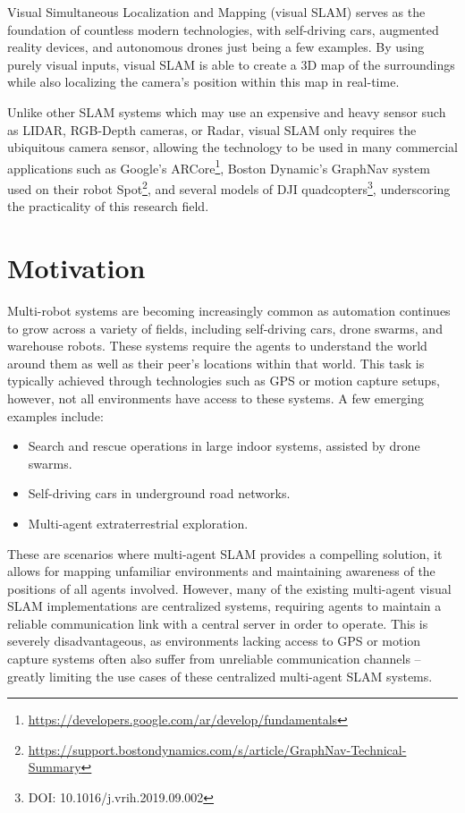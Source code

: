 
\label{sec:introduction}
Visual Simultaneous Localization and Mapping (visual SLAM) serves as the foundation of countless modern technologies, with self-driving cars, augmented reality devices, and autonomous drones just being a few examples. By using purely visual inputs, visual SLAM is able to create a 3D map of the surroundings while also localizing the camera's position within this map in real-time.

Unlike other SLAM systems which may use an expensive and heavy sensor such as LIDAR, RGB-Depth cameras, or Radar, visual SLAM only requires the ubiquitous camera sensor, allowing the technology to be used in many commercial applications such as Google's ARCore\footnote[1]{\url{https://developers.google.com/ar/develop/fundamentals}}, Boston Dynamic's GraphNav system used on their robot Spot\footnote[2]{\url{https://support.bostondynamics.com/s/article/GraphNav-Technical-Summary}}, and several models of DJI quadcopters\footnote[3]{DOI: 10.1016/j.vrih.2019.09.002}, underscoring the practicality of this research field.

\section{Motivation}
\label{sec:motivation}
Multi-robot systems are becoming increasingly common as automation continues to grow across a variety of fields, including self-driving cars, drone swarms, and warehouse robots. These systems require the agents to understand the world around them as well as their peer's locations within that world. This task is typically achieved through technologies such as GPS or motion capture setups, however, not all environments have access to these systems. A few emerging examples include: \noparskip
\smallbreak

{
    \begin{itemize}[nosep]
        \item Search and rescue operations in large indoor systems, assisted by drone swarms.
        \item Self-driving cars in underground road networks.
        \item Multi-agent extraterrestrial exploration.
    \end{itemize}
}

These are scenarios where multi-agent SLAM provides a compelling solution, it allows for mapping unfamiliar environments and maintaining awareness of the positions of all agents involved. However, many of the existing multi-agent visual SLAM implementations are centralized systems, requiring agents to maintain a reliable communication link with a central server in order to operate. This is severely disadvantageous, as environments lacking access to GPS or motion capture systems often also suffer from unreliable communication channels – greatly limiting the use cases of these centralized multi-agent SLAM systems.

